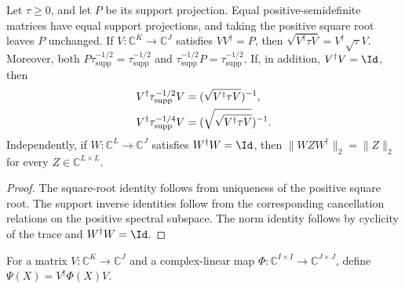 \begin{theorem}
    \label{thm:functional_calculus_support_compression}
    \leanok
    Let $\tau\geq0$, and let $P$ be its support projection.  Equal
    positive-semidefinite matrices have equal support projections, and taking
    the positive square root leaves $P$ unchanged.  If
    $V:\mathbb C^K\to\mathbb C^J$ satisfies $VV^\dagger=P$, then
    $\sqrt{V^\dagger\tau V}=V^\dagger\sqrt\tau V$.
    Moreover, both $P\tau^{-1/2}_{\operatorname{supp}}
    =\tau^{-1/2}_{\operatorname{supp}}$ and
    $\tau^{-1/2}_{\operatorname{supp}}P
    =\tau^{-1/2}_{\operatorname{supp}}$.  If, in addition,
    $V^\dagger V=\Id$, then
    \begin{align}
        V^\dagger\tau^{-1/2}_{\operatorname{supp}}V
        &=(\sqrt{V^\dagger\tau V})^{-1}, \notag \\
        V^\dagger\tau^{-1/4}_{\operatorname{supp}}V
        &=(\sqrt{\sqrt{V^\dagger\tau V}})^{-1}.
        \notag
    \end{align}
    Independently, if $W:\mathbb C^L\to\mathbb C^J$ satisfies
    $W^\dagger W=\Id$, then $\|WZW^\dagger\|_2=\|Z\|_2$ for every
    $Z\in\mathbb C^{L\times L}$.
\end{theorem}

\begin{proof}
    \leanok
    The square-root identity follows from uniqueness of the positive square
    root.  The support inverse identities follow from the corresponding
    cancellation relations on the positive spectral subspace.  The norm
    identity follows by cyclicity of the trace and $W^\dagger W=\Id$.
\end{proof}

\begin{definition}
    \label{def:output_support_compressed_map}
    \leanok
    For a matrix $V:\mathbb C^K\to\mathbb C^J$ and a complex-linear map
    $\Phi:\mathbb C^{I\times I}\to\mathbb C^{J\times J}$, define
    $\Psi(X)=V^\dagger\Phi(X)V$.
\end{definition}

